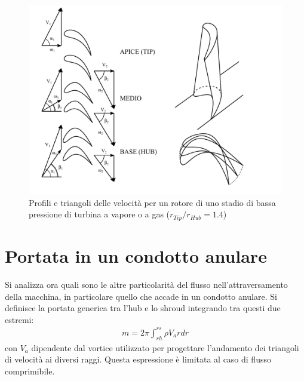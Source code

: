 \begin{figure}
\centering
  \includegraphics[width=.8\textwidth]{fig/TurbVortLib.pdf}
\caption{Profili e triangoli delle velocità per un rotore di uno stadio di bassa pressione di turbina a vapore o a gas ($r_{Tip}/r_{Hub} =1.4$)}
\label{fig:TurbVortLib}
\end{figure}
\section{Portata in un condotto anulare}
Si analizza ora quali sono le altre particolarità del flusso nell'attraversamento della macchina, in particolare quello che accade in un condotto anulare. Si definisce la portata generica tra l'hub e lo shroud integrando tra questi due estremi:
\begin{align*}
\dot{m} = 2 \pi \int_{rh}^{rs} \rho V_a r dr
\end{align*}
con $V_a$ dipendente dal vortice utilizzato per progettare l'andamento dei triangoli di velocità ai diversi raggi. Questa espressione è limitata al caso di flusso comprimibile.


